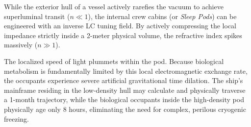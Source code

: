 While the exterior hull of a vessel actively rarefies the vacuum to achieve superluminal transit ($n \ll 1$), the internal crew cabins (or \textit{Sleep Pods}) can be engineered with an inverse LC tuning field. By actively compressing the local impedance strictly inside a 2-meter physical volume, the refractive index spikes massively ($n \gg 1$). 

The localized speed of light plummets within the pod. Because biological metabolism is fundamentally limited by this local electromagnetic exchange rate, the occupants experience severe artificial gravitational time dilation. The ship's mainframe residing in the low-density hull may calculate and physically traverse a 1-month trajectory, while the biological occupants inside the high-density pod physically age only 8 hours, eliminating the need for complex, perilous cryogenic freezing.